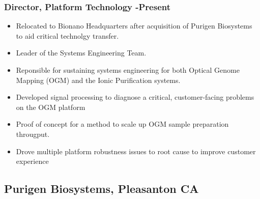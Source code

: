 \documentclass{res}
\begin{document}
\begin{resume}
   \subsubsection{Director, Platform Technology -Present}
    \begin{itemize}
     \item Relocated to Bionano Headquarters after acquisition of Purigen Biosystems to aid critical technolgy transfer.
     \item Leader of the Systems Engineering Team.
     \item Reponsible for sustaining systems engineering for both Optical Genome Mapping (OGM) and the Ionic Purification systems. 
     \item Developed signal processing to diagnose a critical, customer-facing problems on the OGM platform
     \item Proof of concept for a method to scale up OGM sample preparation througput.  
     \item Drove multiple platform robustness issues to root cause to improve customer experience
    \end{itemize}


   \subsection{Purigen Biosystems, Pleasanton CA}
    \vspace{-0.1in}


\end{resume}
\end{document}
